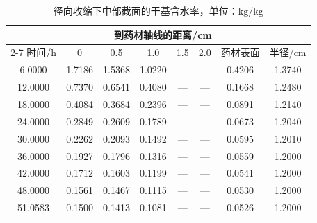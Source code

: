 \begin{table}[!htbp]\centering\small
\caption{径向收缩下中部截面的干基含水率，单位：$\mathrm{kg/kg}$}\label{tab:q4-moisture}
\renewcommand{\arraystretch}{1.15}
\begin{tabular*}{0.96\textwidth}{@{\extracolsep{\fill}}cccccccc}
\toprule
 & \multicolumn{6}{c}{到药材轴线的距离/cm} & \\
\cmidrule(lr){2-7}
时间/h & 0 & 0.5 & 1.0 & 1.5 & 2.0 & 药材表面 & 半径/cm\\\midrule
6.0000 & 1.7186 & 1.5368 & 1.0220 & --- & --- & 0.4206 & 1.3740\\
12.0000 & 0.7370 & 0.6541 & 0.4080 & --- & --- & 0.1668 & 1.2480\\
18.0000 & 0.4084 & 0.3684 & 0.2396 & --- & --- & 0.0891 & 1.2140\\
24.0000 & 0.2849 & 0.2609 & 0.1789 & --- & --- & 0.0673 & 1.2040\\
30.0000 & 0.2262 & 0.2093 & 0.1492 & --- & --- & 0.0595 & 1.2010\\
36.0000 & 0.1927 & 0.1796 & 0.1316 & --- & --- & 0.0559 & 1.2000\\
42.0000 & 0.1712 & 0.1603 & 0.1199 & --- & --- & 0.0541 & 1.2000\\
48.0000 & 0.1561 & 0.1467 & 0.1115 & --- & --- & 0.0530 & 1.2000\\
51.0583 & 0.1500 & 0.1413 & 0.1081 & --- & --- & 0.0526 & 1.2000\\
\bottomrule
\end{tabular*}
\par{}
\end{table}

